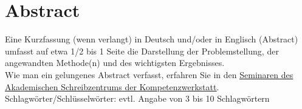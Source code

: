 \section*{Abstract}
Eine Kurzfassung (wenn verlangt) in Deutsch und/oder in Englisch (Abstract) umfasst auf etwa 1/2 bis 1 Seite die Darstellung der Problemstellung, der angewandten Methode(n) und des wichtigsten Ergebnisses.\\
Wie man ein gelungenes Abstract verfasst, erfahren Sie in den \href{https://www.th-koeln.de/studium/schluesselkompetenzen_25490.php}{\underline{Seminaren des Akademischen} \underline{Schreibzentrums der Kompetenzwerkstatt}}.\\
Schlagwörter/Schlüsselwörter: evtl. Angabe von 3 bis 10 Schlagwörtern 
